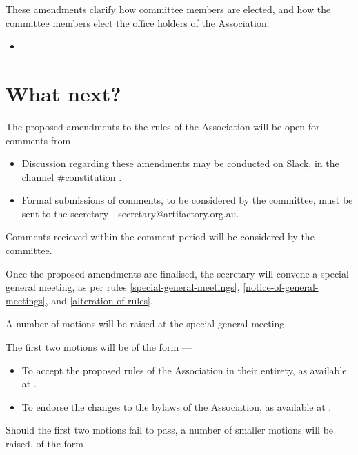\documentclass[../constitution.tex]{subfiles}
\begin{document}
These amendments clarify how committee members are elected, and how the committee members elect the office holders of the Association.

\begin{itemize}
    \item {}
\end{itemize}

\section*{What next?}

The proposed amendments to the rules of the Association will be open for comments from 

\begin{itemize}
    \item Discussion regarding these amendments may be conducted on Slack, in the channel \#constitution .
    \item Formal submissions of comments, to be considered by the committee, must be sent to the secretary - secretary@artifactory.org.au.
\end{itemize}



Comments recieved within the comment period will be considered by the committee.



\bigskip

Once the proposed amendments are finalised, the secretary will convene a special general meeting, as per rules \ref{special-general-meetings}, \ref{notice-of-general-meetings}, and \ref{alteration-of-rules}.

\bigskip

A number of motions will be raised at the special general meeting.

The first two motions will be of the form ---

\begin{itemize}
    \item To accept the proposed rules of the Association in their entirety, as available at .
    \item To endorse the changes to the bylaws of the Association, as available at .
\end{itemize}

\bigskip

Should the first two motions fail to pass, a number of smaller motions will be raised, of the form ---
\end{document}
